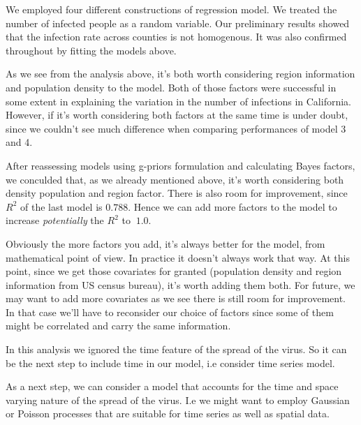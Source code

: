 \documentclass[11pt,twocolumn]{asaproc}
\begin{document}
We employed four different constructions of regression model. We treated the number of infected people as a random variable. Our preliminary results showed that the infection rate across counties is not homogenous. It was also confirmed throughout by fitting the models above. 

As we see from the analysis above, it's both worth considering region information and population density to the model. Both of those factors were successful in some extent in explaining the variation in the number of infections in California. However, if it's worth considering both factors at the same time is under doubt, since we couldn't see much difference when comparing performances of model 3 and 4. 

After reassessing models using g-priors formulation and calculating Bayes factors, we conculded that, as we already mentioned above, it's worth considering both density population and region factor. There is also room for improvement, since $R^2$ of the last model is $0.788$. Hence we can add more factors to the model to increase \textit{potentially} the $R^2$ to $~1.0$.

Obviously the more factors you add, it's always better for the model, from mathematical point of view. In practice it doesn't always work that way. At this point, since we get those covariates for granted (population density and region information from US census bureau), it's worth adding them both. For future, we may want to add more covariates as we see there is still room for improvement. In that case we'll have to reconsider our choice of factors since some of them might be correlated and carry the same information. 


In this analysis we ignored the time feature of the spread of the virus. So it can be the next step to include time in our model, i.e consider time series model. 

As a next step, we can consider a model that accounts for the time and space varying nature of the spread of the virus. I.e we might want to employ Gaussian or Poisson processes that are suitable for time series as well as spatial data. 




\end{document}
